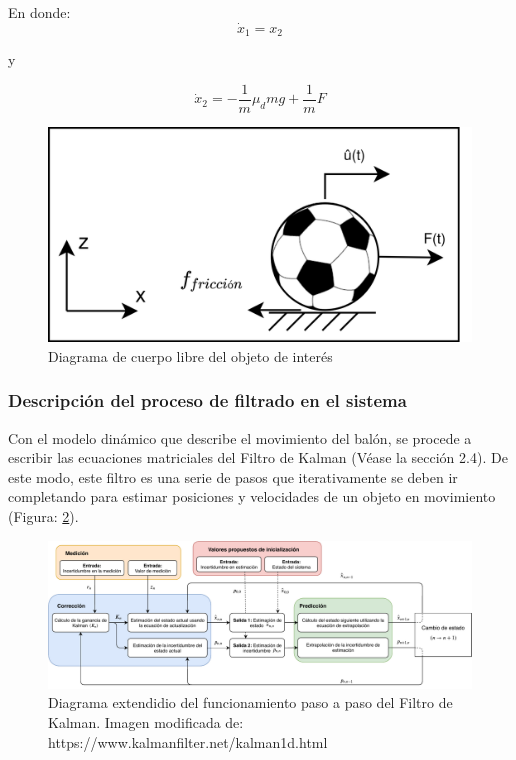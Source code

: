 En donde:
\begin{equation}
\dot{x}_1 = x_2
\label{eq:state_variable_1}
\end{equation}

y 

\begin{equation}
\dot{x}_2 = -\frac{1}{m}\mu_d m g + \frac{1}{m}F
\label{eq:state_variable_2}
\end{equation}


\begin{figure}
\centering
\includegraphics[scale=0.1]{images/dynamic_model.png}
\caption{Diagrama de cuerpo libre del objeto de interés}
\label{fig:dynamic_model}
\end{figure}

		\subsubsection*{Descripción del proceso de filtrado en el sistema}
Con el modelo dinámico que describe el movimiento del balón, se procede a escribir las ecuaciones matriciales del Filtro de Kalman (Véase la sección 2.4). De este modo, este filtro es una serie de pasos que iterativamente se deben ir completando para estimar posiciones y velocidades de un objeto en movimiento (Figura: \ref{fig:kalman_extended_diagram}).

\begin{figure}
\centering
\includegraphics[scale=0.55]{images/kalman_extended_diagram.pdf}
\caption{Diagrama extendidio del funcionamiento paso a paso del Filtro de Kalman. Imagen modificada de: https://www.kalmanfilter.net/kalman1d.html}
\label{fig:kalman_extended_diagram}
\end{figure}


